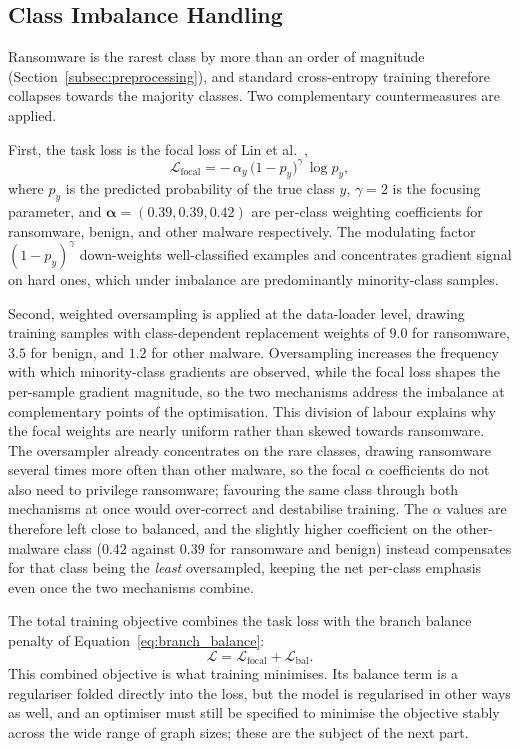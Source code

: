\documentclass[%
    BCOR=10mm,
    DIV=13,
    toc=bibliography,
    toc=listof,
    oneside,
    12pt,
]{scrbook}
\begin{document}
\subsection{Class Imbalance Handling}
\label{subsec:imbalance}

Ransomware is the rarest class by more than an order of magnitude
(Section~\ref{subsec:preprocessing}), and standard cross-entropy training
therefore collapses towards the majority classes. Two complementary
countermeasures are applied.

First, the task loss is the focal loss of Lin et al.~\cite{lin2017focal},
\begin{equation}
  \mathcal{L}_{\mathrm{focal}}
  = -\,\alpha_{y}\,\bigl(1 - p_{y}\bigr)^{\gamma}\,\log p_{y},
  \label{eq:focal}
\end{equation}
where $p_{y}$ is the predicted probability of the true class $y$,
$\gamma = 2$ is the focusing parameter, and
$\boldsymbol{\alpha} = (0.39, 0.39, 0.42)$ are per-class weighting
coefficients for ransomware, benign, and other malware respectively. The
modulating factor $(1-p_y)^{\gamma}$ down-weights well-classified examples and
concentrates gradient signal on hard ones, which under imbalance are
predominantly minority-class samples.

Second, weighted oversampling is applied at the data-loader level, drawing
training samples with class-dependent replacement weights of $9.0$ for
ransomware, $3.5$ for benign, and $1.2$ for other malware. Oversampling
increases the frequency with which minority-class gradients are observed,
while the focal loss shapes the per-sample gradient magnitude, so the two
mechanisms address the imbalance at complementary points of the optimisation.
This division of labour explains why the focal weights are nearly uniform rather
than skewed towards ransomware. The oversampler already concentrates on the rare
classes, drawing ransomware several times more often than other malware, so the
focal $\alpha$ coefficients do not also need to privilege ransomware; favouring
the same class through both mechanisms at once would over-correct and
destabilise training. The $\alpha$ values are therefore left close to balanced,
and the slightly higher coefficient on the other-malware class ($0.42$ against
$0.39$ for ransomware and benign) instead compensates for that class being the
\emph{least} oversampled, keeping the net per-class emphasis even once the two
mechanisms combine.

The total training objective combines the task loss with the branch balance
penalty of Equation~\ref{eq:branch_balance}:
\begin{equation}
  \mathcal{L}
  = \mathcal{L}_{\mathrm{focal}}
  + \mathcal{L}_{\mathrm{bal}}.
  \label{eq:total_loss}
\end{equation}
This combined objective is what training minimises. Its balance term is a
regulariser folded directly into the loss, but the model is regularised in
other ways as well, and an optimiser must still be specified to minimise the
objective stably across the wide range of graph sizes; these are the subject of
the next part.
\end{document}
